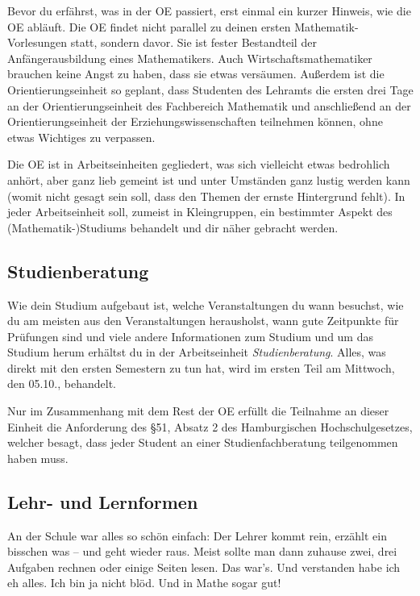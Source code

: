 Bevor du erfährst, was in der OE passiert, erst einmal ein kurzer Hinweis, wie
die OE abläuft. Die OE findet nicht parallel zu deinen ersten
Mathematik-Vorlesungen statt, sondern davor. Sie ist fester Bestandteil der
Anfängerausbildung eines Mathematikers.  Auch Wirtschaftsmathematiker brauchen
keine Angst zu haben, dass sie etwas versäumen. Außerdem ist die
Orientierungseinheit so geplant, dass Studenten des Lehramts die ersten drei
Tage an der Orientierungseinheit des Fachbereich Mathematik und anschließend an
der Orientierungseinheit der Erziehungswissenschaften teilnehmen können, ohne
etwas Wichtiges zu verpassen.

Die OE ist in Arbeitseinheiten gegliedert, was sich vielleicht etwas bedrohlich
anhört, aber ganz lieb gemeint ist und unter Umständen ganz lustig werden kann
(womit nicht gesagt sein soll, dass den Themen der ernste Hintergrund fehlt).
In jeder Arbeitseinheit soll, zumeist in Kleingruppen, ein bestimmter Aspekt
des (Mathematik-)Studiums behandelt und dir näher gebracht werden.

\subsection*{Studienberatung}


Wie dein Studium aufgebaut ist, welche Veranstaltungen du wann besuchst, wie du
am meisten aus den Veranstaltungen herausholst, wann gute Zeitpunkte für
Prüfungen sind und viele andere Informationen zum Studium und um das Studium
herum erhältst du in der Arbeitseinheit \emph{Studienberatung}. Alles, was
direkt mit den ersten Semestern zu tun hat, wird im ersten Teil am Mittwoch,
den 05.10., behandelt.

Nur im Zusammenhang mit dem Rest der OE erfüllt die Teilnahme an dieser Einheit
die Anforderung des \S 51, Absatz 2 des Hamburgischen Hochschulgesetzes,
welcher besagt, dass jeder Student an einer Studienfachberatung teilgenommen
haben muss.

\subsection*{Lehr- und Lernformen}

An der Schule war alles so schön einfach: Der Lehrer kommt rein, erzählt ein
bisschen was -- und geht wieder raus. Meist sollte man dann zuhause zwei, drei
Aufgaben rechnen oder einige Seiten lesen. Das war's. Und verstanden habe ich
eh alles. Ich bin ja nicht blöd. Und in Mathe sogar gut!


